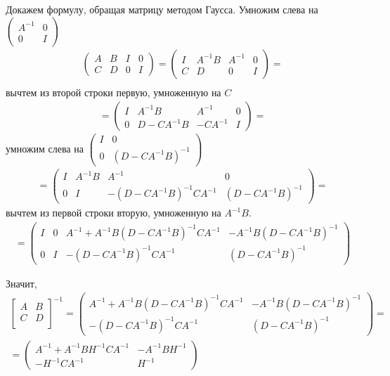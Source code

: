 \begin{solution}
Докажем формулу, обращая матрицу методом Гаусса. Умножим слева на $\left(\begin{array}{cc}
A^{-1} & 0\\ 
0 & I
\end{array}\right)$
\begin{multline*}
\left(\begin{array}{cc|cc}
A & B & I & 0\\ 
C & D & 0 & I
\end{array}\right)=
\left(\begin{array}{cc|cc}
I & A^{-1}B & A^{-1} & 0\\ 
C & D & 0 & I
\end{array}\right)=\\
\end{multline*}
вычтем из второй строки первую, умноженную на $C$
\begin{multline*}
=\left(\begin{array}{cc|cc}
I & A^{-1}B & A^{-1} & 0\\ 
0 & D-CA^{-1}B & -CA^{-1} & I
\end{array}\right)=
\end{multline*}
умножим слева на $\left(\begin{array}{cc}
I & 0\\ 
0 & (D-CA^{-1}B)^{-1}
\end{array}\right)$
\begin{multline*}
=\left(\begin{array}{cc|cc}
I & A^{-1}B & A^{-1} & 0\\ 
0 & I & -(D-CA^{-1}B)^{-1}CA^{-1} & (D-CA^{-1}B)^{-1}
\end{array}\right)=
\end{multline*}
вычтем из первой строки вторую, умноженную на $A^{-1}B$. 
\begin{multline*}
=\left(\begin{array}{cc|cc}
I & 0 & A^{-1}+A^{-1}B(D-CA^{-1}B)^{-1}CA^{-1} & -A^{-1}B(D-CA^{-1}B)^{-1}\\ 
0 & I & -(D-CA^{-1}B)^{-1}CA^{-1} & (D-CA^{-1}B)^{-1}
\end{array}\right)
\end{multline*}

Значит,
\begin{multline*}
\begin{bmatrix} A & B \\ C & D \\ \end{bmatrix}^{-1}
=\left(\begin{array}{cc}
A^{-1}+A^{-1}B(D-CA^{-1}B)^{-1}CA^{-1} & -A^{-1}B(D-CA^{-1}B)^{-1}\\ 
-(D-CA^{-1}B)^{-1}CA^{-1} & (D-CA^{-1}B)^{-1}
\end{array}\right)=\\=
\begin{pmatrix} A^{-1} +A^{-1} BH^{-1} CA^{-1}  & -A^{-1} BH^{-1}\\ -H^{-1} CA^{-1}  & H^{-1}\end{pmatrix}
\end{multline*}


\end{solution}
